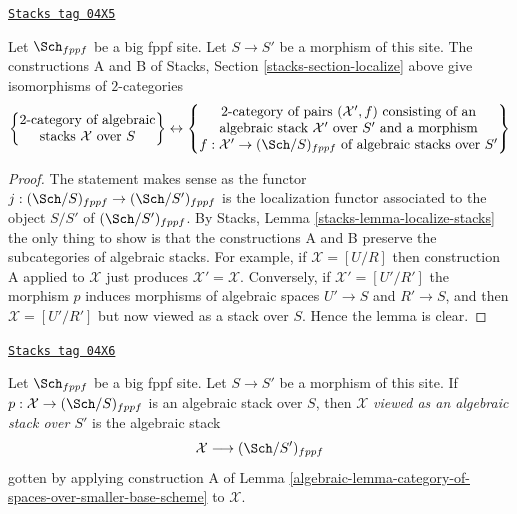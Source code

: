 \begin{lemma}
\label{algebraic-lemma-category-of-spaces-over-smaller-base-scheme}
\href{https://stacks.math.columbia.edu/tag/04X5}{\texttt{Stacks tag 04X5}}

Let $\Sch_{fppf}$ be a big fppf site.
Let $S \to S'$ be a morphism of this site.
The constructions A and B of
Stacks, Section \ref{stacks-section-localize}
above give isomorphisms of $2$-categories
$$
\left\{
\begin{matrix}
2\text{-category of algebraic}\\
\text{stacks }\mathcal{X}\text{ over }S
\end{matrix}
\right\}
\leftrightarrow
\left\{
\begin{matrix}
2\text{-category of pairs }(\mathcal{X}', f)\text{ consisting of an}\\
\text{algebraic stack }\mathcal{X}'\text{ over }S'\text{ and a morphism}\\
f : \mathcal{X}' \to (\Sch/S)_{fppf}\text{ of algebraic stacks over }S'
\end{matrix}
\right\}
$$
\end{lemma}

\begin{proof}
The statement makes sense as the functor
$j : (\Sch/S)_{fppf} \to (\Sch/S')_{fppf}$
is the localization functor associated to the object $S/S'$
of $(\Sch/S')_{fppf}$. By
Stacks, Lemma \ref{stacks-lemma-localize-stacks}
the only thing to show is that the constructions A and B
preserve the subcategories of algebraic stacks.
For example, if $\mathcal{X} = [U/R]$ then construction A
applied to $\mathcal{X}$ just produces
$\mathcal{X}' = \mathcal{X}$. Conversely, if $\mathcal{X}' = [U'/R']$
the morphism $p$ induces morphisms of algebraic spaces
$U' \to S$ and $R' \to S$, and then $\mathcal{X} = [U'/R']$
but now viewed as a stack over $S$. Hence the lemma is clear.
\end{proof}

\begin{definition}[Viewed as]
\label{algebraic-definition-viewed-as}
\href{https://stacks.math.columbia.edu/tag/04X6}{\texttt{Stacks tag 04X6}}

Let $\Sch_{fppf}$ be a big fppf site.
Let $S \to S'$ be a morphism of this site.
If $p : \mathcal{X} \to (\Sch/S)_{fppf}$
is an algebraic stack over $S$, then
$\mathcal{X}$ {\it viewed as an algebraic stack over $S'$}
is the algebraic stack
$$
\mathcal{X} \longrightarrow (\Sch/S')_{fppf}
$$
gotten by applying construction A of
Lemma \ref{algebraic-lemma-category-of-spaces-over-smaller-base-scheme}
to $\mathcal{X}$.
\end{definition}

